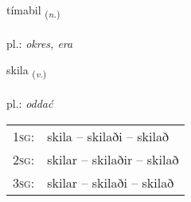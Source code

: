 \documentclass[frontgrid, backgrid]{flacards}\usepackage[]{graphicx}\usepackage[]{xcolor}
\begin{document}
\renewcommand{\flhead}{\vskip5pt \fboxsep=0pt {\small\bfseries\footnotesize Nafnorð | rzeczownik}}
\renewcommand{\fcfoot}{\vskip5pt \fboxsep=0pt \hspace{2pt}{\small\bfseries\footnotesize 1K}}

\renewcommand{\blhead}{\vskip5pt {\small\bfseries\footnotesize Nafnorð | rzeczownik }}
\renewcommand{\bcfoot}{\vskip5pt \hspace{2pt}{\small\bfseries\footnotesize 1K}}


{tímabil \small{\textsubscript{(\textit{n.})}} \\[1ex] %
\textphonetic{[tʰiːmapɪl]} \\
pl.: \emph{okres, era} \\  [2ex]
\renewcommand*{\arraystretch}{0.8}
}

\renewcommand{\flhead}{\vskip5pt \fboxsep=0pt {\small\bfseries\footnotesize Sagnorð | czasownik}}
\renewcommand{\fcfoot}{\vskip5pt \fboxsep=0pt \hspace{2pt}{\small\bfseries\footnotesize 1K}}

\renewcommand{\blhead}{\vskip5pt {\small\bfseries\footnotesize Sagnorð | czasownik }}
\renewcommand{\bcfoot}{\vskip5pt \hspace{2pt}{\small\bfseries\footnotesize 1K}}


{skila \small{\textsubscript{(\textit{v.})}} \\[1ex] %
\textphonetic{[scɪːla]} \\
pl.: \emph{oddać} \\  [2ex]
\renewcommand*{\arraystretch}{0.8}
\begin{tabular}{p{1cm}l}
\textsc{1sg}: & skila -- skilaði -- skilað \\ 
\textsc{2sg}: & skilar -- skilaðir -- skilað \\ 
\textsc{3sg}: & skilar -- skilaði -- skilað \\ 
\end{tabular}
}
\end{document}
